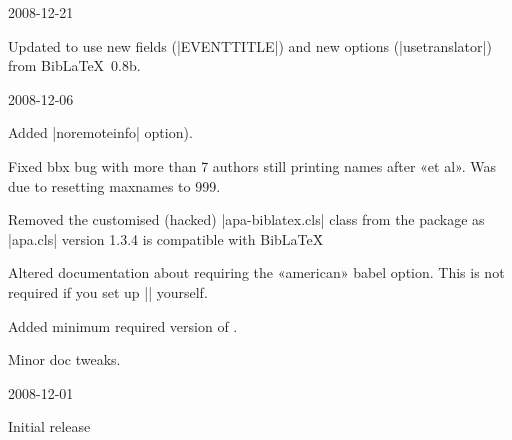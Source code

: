\documentclass{ltxdockit}
\begin{document}
\begin{changelog}
\begin{release}{0.3}{2008-12-21}
\item Updated to use new fields (|EVENTTITLE|) and new options
  (|usetranslator|) from Bib\LaTeX\ 0.8b.
\end{release}

\begin{release}{0.2}{2008-12-06}
\item Added |noremoteinfo| option).
\item Fixed bbx bug with more than 7 authors still printing names after «et al». Was
  due to resetting maxnames to 999.
\item Removed the customised (hacked) |apa-biblatex.cls| class from the package as
  |apa.cls| version 1.3.4 is compatible with Bib\LaTeX\.
\item Altered documentation about requiring the «american» babel option.
  This is not required if you set up |\DeclareQuotePunctuation| yourself.
\item Added minimum required version of .
\item Minor doc tweaks.
\end{release}

\begin{release}{0.1}{2008-12-01}
\item Initial release
\end{release}



\end{changelog}
\end{document}
